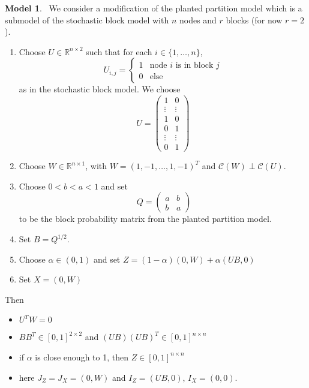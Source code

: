 \documentclass[notheorems]{beamer}
\theoremstyle{definition}
\newtheorem{modl}[model]{Model}
\newcommand{\al}{\alpha}
\newcommand{\R}{\mathbb{R}}
\newcommand{\MC}{\mathcal{C}}
\begin{document}
\begin{frame}
\begin{modl}\
We consider a modification of the planted partition model which is a submodel of the stochastic block model with $n$ nodes and $r$ blocks (for now $r=2$).
\begin{enumerate}
    \item Choose $U \in \R^{n \times 2}$ such that for each $i \in \{1, \ldots, n\}$, 
    \[
    U_{i,j} = 
    \begin{cases}
    1 & \text{node $i$ is in block $j$} \\
    0 & \text{else}
    \end{cases}
    \] 
    as in the stochastic block model. We choose
    \[
    U = 
    \begin{pmatrix}
    1 & 0 \\
    \vdots & \vdots \\
    1 & 0 \\
    0 & 1 \\
    \vdots & \vdots \\
    0 & 1
    \end{pmatrix}
    \]
    \item Choose $W \in \R^{n \times 1}$, with $W = (1, -1, \ldots, 1, -1)^T$ and $\MC(W) \perp \MC(U)$. 
    \item Choose $0<b<a<1$ and set
    \[\
    Q = 
    \begin{pmatrix}
    a & b \\
    b & a
    \end{pmatrix}
    \]
    to be the block probability matrix from the planted partition model.
    \item Set $B = Q^{1/2}$.
    \item Choose $\al \in (0,1)$ and set $Z = (1-\al) (0,W) + \al (UB, 0)$
    \item Set $X = (0,W)$
\end{enumerate}
Then
\begin{itemize}
    \item $U^TW = 0$
    \item $BB^T \in [0,1]^{2 \times 2}$ and $(UB)(UB)^T \in [0,1]^{n \times n}$
    \item if $\al$ is close enough to 1, then $Z \in  [0,1]^{n \times n}$
    \item here $J_Z = J_X = (0, W)$ and $I_Z = (UB, 0)$, $I_X = (0,0)$.
\end{itemize}
\end{modl}
\end{frame}
\end{document}
